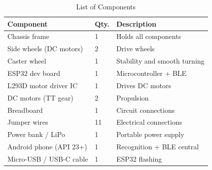 \begin{table}[H]
\caption{List of Components}
\centering
\begin{tabular}{lll}
\toprule
\textbf{Component}       & \textbf{Qty.} & \textbf{Description} \\
\midrule
Chassis frame            & 1  & Holds all components \\
Side wheels (DC motors)  & 2  & Drive wheels \\
Caster wheel             & 1  & Stability and smooth turning \\
ESP32 dev board          & 1  & Microcontroller + BLE \\
L293D motor driver IC    & 1  & Drives DC motors \\
DC motors (TT gear)      & 2  & Propulsion \\
Breadboard               & 1  & Circuit connections \\
Jumper wires             & 11 & Electrical connections \\
Power bank / LiPo        & 1  & Portable power supply \\
Android phone (API 23+)  & 1  & Recognition + BLE central \\
Micro-USB / USB-C cable  & 1  & ESP32 flashing \\
\bottomrule
\end{tabular}
\label{tab:components}
\end{table}